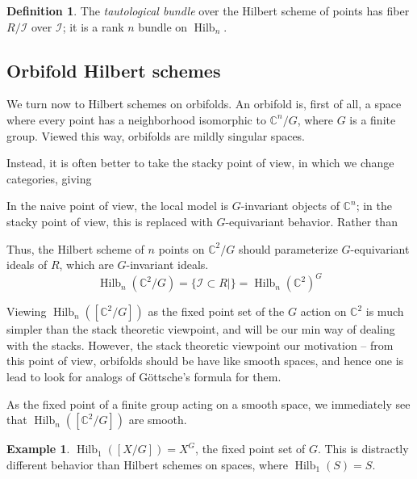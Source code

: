 \documentclass{amsart}[12pt]
\theoremstyle{definition}
\newtheorem{example}[dummy]{Example}
\newtheorem{definition}[dummy]{Definition}
\newcommand{\C}{\mathbb{C}}
\DeclareMathOperator{\Hilb}{Hilb}
\begin{document}
\begin{definition}
The \emph{tautological bundle} over the Hilbert scheme of points has fiber $R/\mathcal{I}$ over $\mathcal{I}$; it is a rank $n$ bundle on $\Hilb_n$.
\end{definition}


\subsection{Orbifold Hilbert schemes}

We turn now to Hilbert schemes on orbifolds.  An orbifold is, first of all, a space where every point has a neighborhood isomorphic to $\C^n/G$, where $G$ is a finite group.  Viewed this way, orbifolds are mildly singular spaces.  

Instead, it is often better to take the stacky point of view, in which we change categories, giving 


In the naive point of view, the local model is $G$-invariant objects of $\C^n$; in the stacky point of view, this is replaced with $G$-equivariant behavior.  Rather than 


Thus, the Hilbert scheme of $n$ points on $\C^2/G$ should parameterize $G$-equivariant ideals of $R$, which are $G$-invariant ideals.  
$$\Hilb_n(\C^2/G)=\{\mathcal{I}\subset R | \} =\Hilb_n(\C^2)^G$$

Viewing $\Hilb_n([\C^2/G])$ as the fixed point set of the $G$ action on $\C^2$ is much simpler than the stack theoretic viewpoint, and will be our min way of dealing with the stacks.  However, the stack theoretic viewpoint our motivation -- from this point of view, orbifolds should be have like smooth spaces, and hence one is lead to look for analogs of G\"ottsche's formula for them.


As the fixed point of a finite group acting on a smooth space, we immediately see that $\Hilb_n([\C^2/G])$ are smooth.



\begin{example}
$\Hilb_1([X/G])=X^G$, the fixed point set of $G$.  This is distractly different behavior than Hilbert schemes on spaces, where $\Hilb_1(S)=S$.
\end{example}
\end{document}
